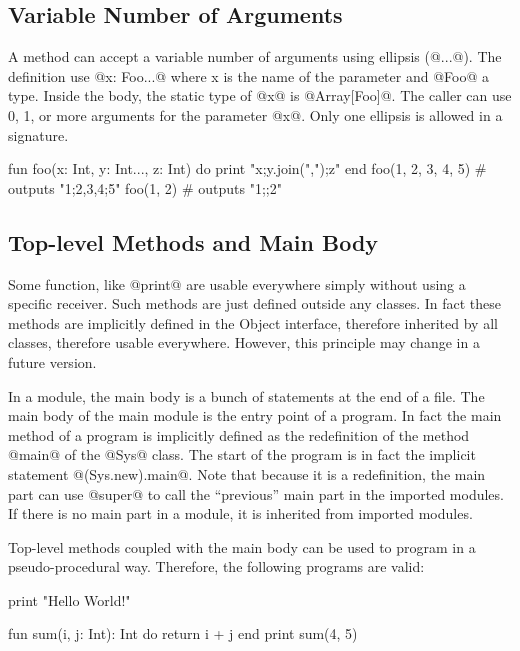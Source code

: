 
\subsection{Variable Number of Arguments}\label{vararg}

A method can accept a variable number of arguments using ellipsis (@...@).
The definition use @x: Foo...@ where x is the name of the parameter and @Foo@ a type.
Inside the body, the static type of @x@ is @Array[Foo]@.
The caller can use 0, 1, or more arguments for the parameter @x@.
Only one ellipsis is allowed in a signature.

\begin{lst}
fun foo(x: Int, y: Int..., z: Int)
do
	print "{x};{y.join(",")};{z}"
end
foo(1, 2, 3, 4, 5) # outputs "1;2,3,4;5"
foo(1, 2) # outputs "1;;2"
\end{lst}

\subsection{Top-level Methods and Main Body}\label{toplevel}

Some function, like @print@ are usable everywhere simply without using a specific receiver.
Such methods are just defined outside any classes.
In fact these methods are implicitly defined in the Object interface, therefore inherited by all classes, therefore usable everywhere.
However, this principle may change in a future version.

In a module, the main body is a bunch of statements at the end of a file.
The main body of the main module is the entry point of a program.
In fact the main method of a program is implicitly defined as the redefinition of the method @main@ of the @Sys@ class.
The start of the program is in fact the implicit statement @(Sys.new).main@.
Note that because it is a redefinition, the main part can use @super@ to call the ``previous'' main part in the imported modules.
If there is no main part in a module, it is inherited from imported modules.

Top-level methods coupled with the main body can be used to program in a pseudo-procedural way.
Therefore, the following programs are valid:
\begin{multicols}{2}
\begin{lst}
print "Hello World!"
\end{lst}
\columnbreak 
\begin{lst}
fun sum(i, j: Int): Int
do
	return i + j
end
print sum(4, 5)
\end{lst}
\end{multicols}

